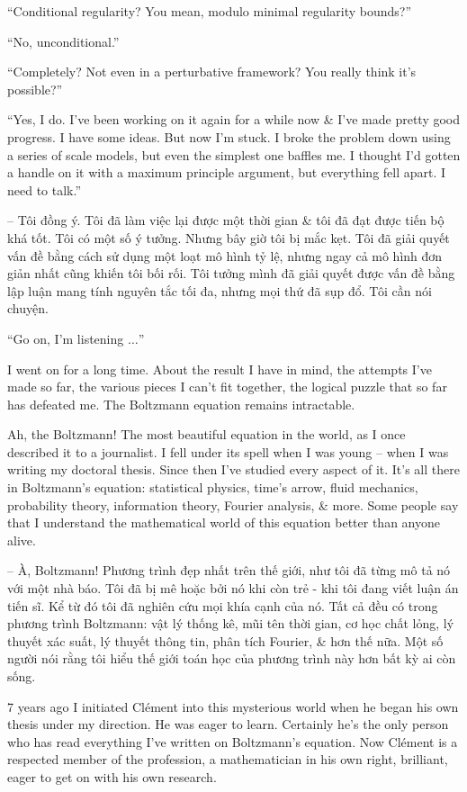 \documentclass{article}
\begin{document}
\begin{enumerate}
	``Conditional regularity? You mean, modulo minimal regularity bounds?''
	
	``No, unconditional.''
	
	``Completely? Not even in a perturbative framework? You really think it's possible?''
	
	``Yes, I do. I've been working on it again for a while now \& I've made pretty good progress. I have some ideas. But now I'm stuck. I broke the problem down using a series of scale models, but even the simplest one baffles me. I thought I'd gotten a handle on it with a maximum principle argument, but everything fell apart. I need to talk.''
	
	-- Tôi đồng ý. Tôi đã làm việc lại được một thời gian \& tôi đã đạt được tiến bộ khá tốt. Tôi có một số ý tưởng. Nhưng bây giờ tôi bị mắc kẹt. Tôi đã giải quyết vấn đề bằng cách sử dụng một loạt mô hình tỷ lệ, nhưng ngay cả mô hình đơn giản nhất cũng khiến tôi bối rối. Tôi tưởng mình đã giải quyết được vấn đề bằng lập luận mang tính nguyên tắc tối đa, nhưng mọi thứ đã sụp đổ. Tôi cần nói chuyện.
	
	``Go on, I'm listening $\ldots$''
	
	I went on for a long time. About the result I have in mind, the attempts I've made so far, the various pieces I can't fit together, the logical puzzle that so far has defeated me. The Boltzmann equation remains intractable.
	
	Ah, the Boltzmann! The most beautiful equation in the world, as I once described it to a journalist. I fell under its spell when I was young -- when I was writing my doctoral thesis. Since then I've studied every aspect of it. It's all there in Boltzmann's equation: statistical physics, time's arrow, fluid mechanics, probability theory, information theory, Fourier analysis, \& more. Some people say that I understand the mathematical world of this equation better than anyone alive.
	
	-- À, Boltzmann! Phương trình đẹp nhất trên thế giới, như tôi đã từng mô tả nó với một nhà báo. Tôi đã bị mê hoặc bởi nó khi còn trẻ - khi tôi đang viết luận án tiến sĩ. Kể từ đó tôi đã nghiên cứu mọi khía cạnh của nó. Tất cả đều có trong phương trình Boltzmann: vật lý thống kê, mũi tên thời gian, cơ học chất lỏng, lý thuyết xác suất, lý thuyết thông tin, phân tích Fourier, \& hơn thế nữa. Một số người nói rằng tôi hiểu thế giới toán học của phương trình này hơn bất kỳ ai còn sống.
	
	7 years ago I initiated {\sc Cl\'ement} into this mysterious world when he began his own thesis under my direction. He was eager to learn. Certainly he's the only person who has read everything I've written on Boltzmann's equation. Now {\sc Cl\'ement} is a respected member of the profession, a mathematician in his own right, brilliant, eager to get on with his own research.
	

\end{enumerate}
\end{document}
